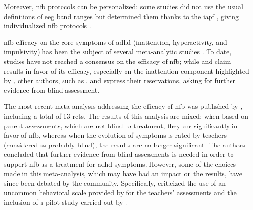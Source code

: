 Moreover, \gls{nfb} protocols can be personalized: some studies did not use the usual definitions of \gls{eeg} band ranges 
but determined them thanks to the \gls{iapf} \citep{Klimesch1999}, giving individualized \gls{nfb} protocols \citep{Liu2016, Escolano2014, Bazanova2018}.

\Gls{nfb} efficacy on the core symptoms of \gls{adhd} (inattention, hyperactivity, and impulsivity) has been the 
subject of several meta-analytic studies \citep{Loo2005, Lofthouse2012, Arns2009, Micoulaud2014, Sonuga-Barke2013}. 
To date, studies have not reached a consensus on the efficacy of \gls{nfb}; while \citet{Arns2009} and \citet{Micoulaud2014} 
claim results in favor of its efficacy, especially on the inattention component highlighted by \citeauthor{Micoulaud2014}, other authors, such as
\citet{Loo2005, Lofthouse2012}, and \citet{Sonuga-Barke2013} express their reservations, asking for further evidence from blind assessment.

The most recent meta-analysis addressing the efficacy of \gls{nfb} was published by \citet{Cortese2016}, including a total of 13
\glspl{rct}. The results of this analysis are mixed: when based on parent assessments, which are not blind to treatment, they are significantly 
in favor of \gls{nfb}, whereas when the evolution of symptoms is rated by teachers (considered as probably blind), the results are no longer 
significant. The authors concluded that further evidence from blind assessments is needed in order to support \gls{nfb} as a treatment for \gls{adhd} symptoms.
However, some of the choices made in this meta-analysis, which may have had an impact on the results, have since been debated by the community. Specifically, 
\citet{Micoulaud2016} criticized the use of an uncommon behavioral scale provided by \citet{Steiner2014} for the teachers' assessments 
and the inclusion of a pilot study carried out by \citet{Arnold2014}. 

